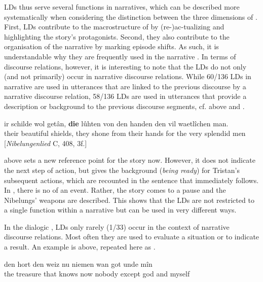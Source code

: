 \documentclass[output=paper,colorlinks,citecolor=brown]{langscibook}
\begin{document}
LDs  thus serve several functions in narratives, which can be described more systematically when considering the distinction between the three dimensions of . First, LDs contribute to the macrostructure of  by (re-)ac-tualizing and highlighting the story's protagonists. Second, they also contribute to the organisation of the narrative by marking episode shifts. As such, it is understandable why they are frequently used in the narrative . In terms of discourse relations, however, it is interesting to note that the LDs do not only (and not primarily) occur in narrative discourse relations. While 60/136 LDs in narrative  are used in utterances that are linked to the previous discourse by a narrative discourse relation, 58/136 LDs are used in utterances that provide a description or background to the previous discourse segments, cf.  above and .

\ea%
\label{ex:zeman:6}
\gll ir schilde wol getân, \textbf{die} lûhten von den handen den vil waetlîchen man.\\
their beautiful shields, {} they shone from their hands {for the} very splendid men \\
\glt \hfill [\textit{Nibelungenlied} C, 408, 3f.]
\z 

 above sets a new reference point for the story now. However, it does not indicate the next step of action, but gives the background (\textit{being ready}) for Tristan's subsequent actions, which are recounted in the sentence that immediately follows. In , there is no  of an event. Rather, the story comes to a pause and the Nibelungs' weapons are described. This shows that the LDs are not restricted to a single function within a narrative but can be used in very different ways.

In the dialogic , LDs only rarely (1/33) occur in the context of narrative discourse relations. Most often they are used to evaluate a situation or to indicate a result. An example is  above, repeated here as .

\ea%
\label{ex:zeman:7}
\gll den hort den weiz nu niemen wan got unde mîn \\
the treasure that knows now nobody except god and myself\\
\z 
 
\end{document}
